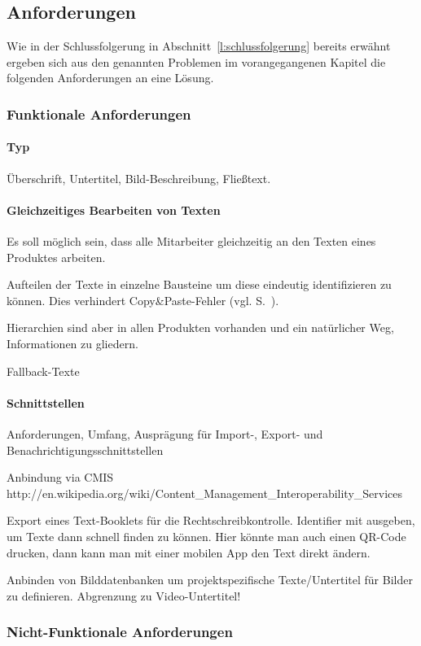 \subsection{Anforderungen}\label{l:anforderungen}

Wie in der Schlussfolgerung in Abschnitt~\ref{l:schlussfolgerung} bereits erwähnt ergeben sich aus den genannten Problemen im vorangegangenen Kapitel die folgenden Anforderungen an eine Lösung.

\subsubsection{Funktionale Anforderungen}

\TODO

\paragraph{Typ} Überschrift, Untertitel, Bild-Beschreibung, Fließtext.

\paragraph{Gleichzeitiges Bearbeiten von Texten} Es soll möglich sein, dass alle  Mitarbeiter gleichzeitig an den Texten eines Produktes arbeiten.


Aufteilen der Texte in einzelne Bausteine um diese eindeutig identifizieren zu können. Dies verhindert Copy\&Paste-Fehler (vgl. S.~\pageref{p:serielles-konzept}).

\label{l:hierarchien} Hierarchien sind aber in allen Produkten vorhanden und ein natürlicher Weg, Informationen zu gliedern. 

Fallback-Texte

\paragraph{Schnittstellen}

Anforderungen, Umfang, Ausprägung für Import-, Export- und Benachrichtigungsschnittstellen

Anbindung via CMIS http://en.wikipedia.org/wiki/Content\_Management\_Interoperability\_Services

Export eines Text-Booklets für die Rechtschreibkontrolle. Identifier mit ausgeben, um Texte dann schnell finden zu können. Hier könnte man auch einen QR-Code drucken, dann kann man mit einer mobilen App den Text direkt ändern.

Anbinden von Bilddatenbanken um projektspezifische Texte/Untertitel für Bilder zu definieren. Abgrenzung zu Video-Untertitel!

\subsubsection{Nicht-Funktionale Anforderungen}



